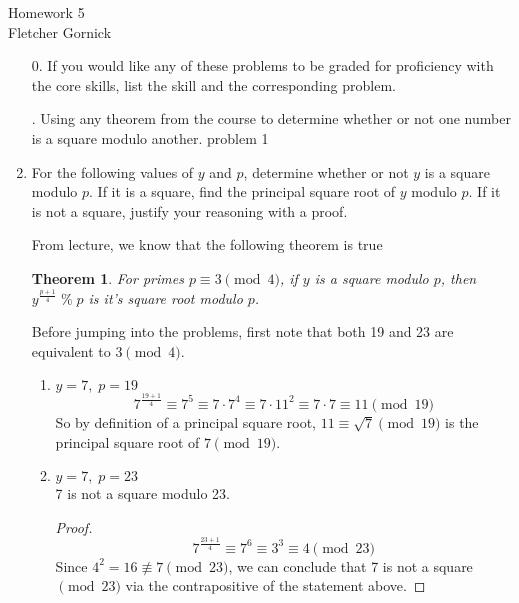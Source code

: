 \documentclass[11pt]{article}
\newcommand{\n}{\vspace{0.5cm}}
\newtheorem*{theorem}{Theorem}
\begin{document}
  \begin{center}
    {\Large Homework 5} \n\\
    Fletcher Gornick
  \end{center}

  \begin{enumerate}
    \item[0.] If you would like any of these problems to be graded for proficiency with the core skills, list the skill and the corresponding problem.
      \begin{outline}
        . Using any theorem from the course to determine whether or not one number is a square modulo another.
          \2 problem 1
      \end{outline} \n

    \item For the following values of \(y\) and \(p\), determine whether or not \(y\) is a square modulo \(p\).  If it is a square, find the principal square root of \(y\) modulo \(p\).  If it is not a square, justify your reasoning with a proof.

      From lecture, we know that the following theorem is true
      \begin{theorem}
        For primes \(p \equiv 3 \pmod4\), if \(y\) is a square modulo \(p\), then \(y^{\frac{p+1}{4}} \;\%\; p\) is it's square root modulo \(p\).
      \end{theorem}

      Before jumping into the problems, first note that both 19 and 23 are equivalent to \(3 \pmod 4\).
      
      \begin{enumerate}
        \item \(y = 7, \; p = 19\)
          \[7^{\frac{19+1}{4}} \equiv 7^5 \equiv 7 \cdot 7^4 \equiv 7 \cdot 11^2 \equiv 7 \cdot 7 \equiv 11 \pmod{19}\]
          So by definition of a principal square root, \(11 \equiv \sqrt7 \pmod{19}\) is the principal square root of \(7 \pmod{19}\). \n

        \item \(y = 7, \; p = 23\) \n\\
          7 is not a square modulo 23.
          \begin{proof}
            \[7^{\frac{23+1}{4}} \equiv 7^6 \equiv 3^3 \equiv 4 \pmod{23}\]
            Since \(4^2 = 16 \not\equiv 7 \pmod{23}\), we can conclude that 7 is not a square \(\pmod{23}\) via the contrapositive of the statement above.
          \end{proof}
          


\end{enumerate}
\end{enumerate}
\end{document}
